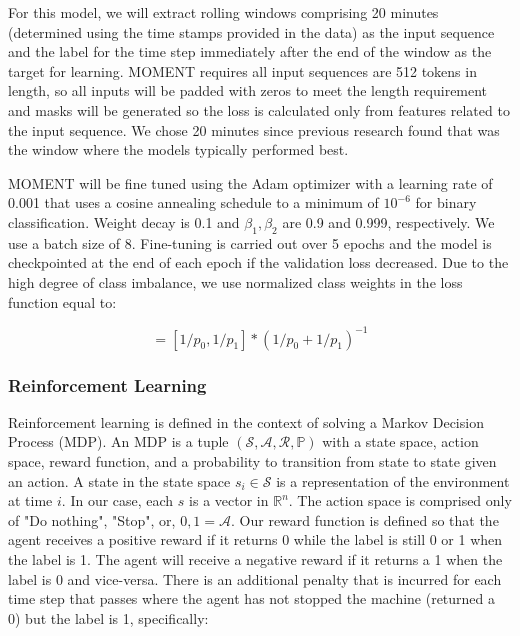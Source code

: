 \documentclass[12pt]{article}
\begin{document}
For this model, we will extract rolling windows comprising 20 minutes (determined using the time stamps 
provided in the data) as the input sequence and the label for the time step immediately after the end of the
window as the target for learning. MOMENT requires all input sequences are 512 tokens in length, so
all inputs will be padded with zeros to meet the length requirement and masks will be generated
so the loss is calculated only from features related to the input sequence. We chose 20 minutes since
previous research found that was the window where the models typically performed best\cite{pinciroli_vago_predicting_2024}.

MOMENT will be fine tuned using the Adam optimizer\cite{Kingma2014AdamAM} with a learning rate of 0.001
that uses a cosine annealing schedule to a minimum of $10^{-6}$ for binary classification. Weight decay
is 0.1 and $\beta_1, \beta_2$ are 0.9 and 0.999, respectively. We use a batch size of 8. Fine-tuning is carried out over 5 epochs 
and the model is checkpointed at the end of each epoch if the validation loss decreased. Due to the high 
degree of class imbalance, we use normalized class weights in the loss function equal to:

\begin{equation}
    [w_0,w_1] = [1/p_0, 1/p_1] * (1/p_0+1/p_1)^{-1}
\end{equation}


\subsubsection{Reinforcement Learning}
Reinforcement learning is defined in the context of solving a Markov Decision Process (MDP). An MDP is a tuple
$(\mathcal{S},\mathcal{A},\mathcal{R},\mathbb{P})$ with a state space, action space, reward function, and
a probability to transition from state to state given an action. A state in the state space $s_i\in \mathcal{S}$
is a representation of the environment at time $i$. In our case, each $s$ is a vector in $\mathbb{R}^n$.
The action space is comprised only of {"Do nothing", "Stop"}, or, ${0,1}=\mathcal{A}$. Our reward function
is defined so that the agent receives a positive reward if it returns 0 while the label is still 0 or 1
when the label is 1. The agent will receive a negative reward if it returns a 1 when the label is 0 and
vice-versa. There is an additional penalty that is incurred for each time step that passes where the agent
has not stopped the machine (returned a 0) but the label is 1, specifically:
\end{document}
